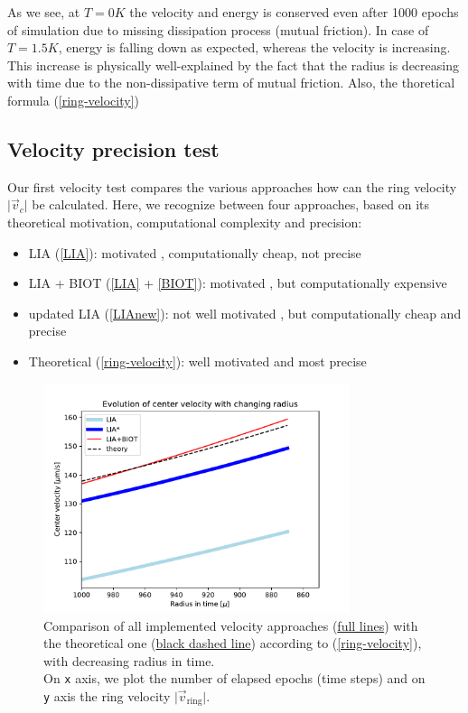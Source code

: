 As we see, at $T=0\unit{K}$ the velocity and energy is conserved even after 1000 epochs of simulation due to missing dissipation process (mutual friction). In case of $T=1.5\unit{K}$, energy is falling down as expected, whereas the velocity is increasing. This increase is physically well-explained by the fact that the radius is decreasing with time due to the non-dissipative term of mutual friction. Also, the thoretical formula (\ref{ring-velocity})


\subsection*{Velocity precision test}

Our first velocity test compares the various approaches how can the ring velocity $\vert \vec{v}_c \vert $ be calculated. Here, we recognize between four approaches, based on its theoretical motivation, computational complexity and precision:
\begin{itemize}
	\item LIA (\ref{LIA}): motivated \cite{barenghi}, computationally cheap, not precise
	\item LIA + BIOT (\ref{LIA} + \ref{BIOT}): motivated \cite{barenghi}, but computationally expensive
	\item updated LIA (\ref{LIAnew}): not well motivated \cite{samuels}, but computationally cheap and precise
	\item Theoretical (\ref{ring-velocity}): well motivated \cite{roberts} and most precise
\end{itemize}

\begin{figure}[h]
	\centering
	\includegraphics[width=0.8\textwidth]{graphics/results/vels_radius}
	\caption{Comparison of all implemented velocity approaches (\underline{full lines}) with the theoretical one (\underline{black dashed line}) according to (\ref{ring-velocity}), with decreasing radius in time.\\
	On \texttt{x} axis, we plot the number of elapsed epochs (time steps) and on \texttt{y} axis the ring velocity $\vert \vec{v}_{\text{ring}} \vert$.}
	\label{vels-radius}
\end{figure}

